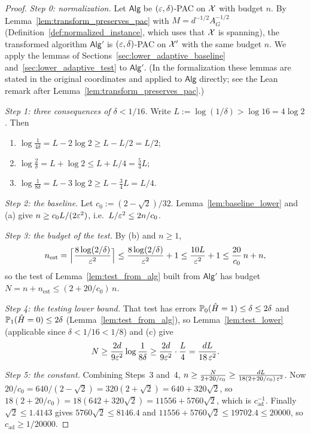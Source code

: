 \begin{proof}
\leanok
{}
\emph{Step 0: normalization.} Let $\mathsf{Alg}$ be $(\varepsilon,\delta)$-PAC on $\mathcal{X}$ with budget
$n$. By Lemma~\ref{lem:transform_preserves_pac} with $M = d^{-1/2}A_G^{-1/2}$
(Definition~\ref{def:normalized_instance}, which uses that $\mathcal{X}$ is spanning), the transformed algorithm $\mathsf{Alg}'$ is
$(\varepsilon,\delta)$-PAC on $\mathcal{X}'$ with the same budget $n$. We apply the lemmas of
Sections~\ref{sec:lower_adaptive_baseline} and~\ref{sec:lower_adaptive_test} to $\mathsf{Alg}'$.
(In the formalization these lemmas are stated in the original coordinates and applied to
$\mathsf{Alg}$ directly; see the Lean remark after Lemma~\ref{lem:transform_preserves_pac}.)

\emph{Step 1: three consequences of $\delta < 1/16$.} Write $L := \log(1/\delta) > \log 16 = 4\log 2$.
Then
\begin{enumerate}
  \item[(a)] $\log\frac{1}{4\delta} = L - 2\log 2 \ge L - L/2 = L/2$;
  \item[(b)] $\log\frac{2}{\delta} = L + \log 2 \le L + L/4 = \frac54 L$;
  \item[(c)] $\log\frac{1}{8\delta} = L - 3\log 2 \ge L - \frac34 L = L/4$.
\end{enumerate}

\emph{Step 2: the baseline.} Let $c_0 := (2-\sqrt2)/32$. Lemma~\ref{lem:baseline_lower} and (a)
give $n \ge c_0 L/(2\varepsilon^2)$, i.e.\ $L/\varepsilon^2 \le 2n/c_0$.

\emph{Step 3: the budget of the test.} By (b) and $n \ge 1$,
\[
  n_{\mathrm{est}} = \Big\lceil\frac{8\log(2/\delta)}{\varepsilon^2}\Big\rceil
  \le \frac{8\log(2/\delta)}{\varepsilon^2} + 1 \le \frac{10 L}{\varepsilon^2} + 1
  \le \frac{20}{c_0}\, n + n ,
\]
so the test of Lemma~\ref{lem:test_from_alg} built from $\mathsf{Alg}'$ has budget
$N = n + n_{\mathrm{est}} \le (2 + 20/c_0)\, n$.

\emph{Step 4: the testing lower bound.} That test has errors $\mathbb{P}_0(\hat H = 1) \le \delta \le 2\delta$
and $\mathbb{P}_1(\hat H = 0) \le 2\delta$ (Lemma~\ref{lem:test_from_alg}), so Lemma~\ref{lem:test_lower}
(applicable since $\delta < 1/16 < 1/8$) and (c) give
\[
  N \ge \frac{2d}{9\varepsilon^2}\log\frac{1}{8\delta} \ge \frac{2d}{9\varepsilon^2}\cdot\frac{L}{4} = \frac{d L}{18\,\varepsilon^2}.
\]

\emph{Step 5: the constant.} Combining Steps~3 and~4,
$n \ge \frac{N}{2 + 20/c_0} \ge \frac{dL}{18(2 + 20/c_0)\,\varepsilon^2}$. Now
$20/c_0 = 640/(2-\sqrt2) = 320(2+\sqrt2) = 640 + 320\sqrt2$, so
$18(2 + 20/c_0) = 18(642 + 320\sqrt2) = 11556 + 5760\sqrt2$, which is $c_{\mathrm{ad}}^{-1}$.
Finally $\sqrt2 \le 1.4143$ gives $5760\sqrt2 \le 8146.4$ and
$11556 + 5760\sqrt2 \le 19702.4 \le 20000$, so $c_{\mathrm{ad}} \ge 1/20000$.
\end{proof}


